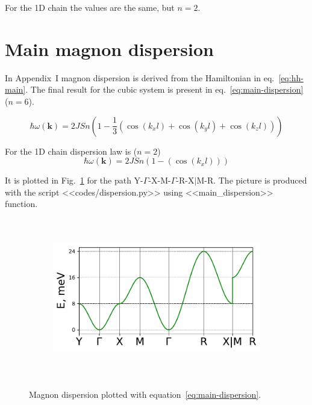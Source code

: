 \documentclass[a4paper,12pt]{article}
\begin{document}
        For the 1D chain the values are the same, but $n = 2$.

    \section{Main magnon dispersion}

        In Appendix~I magnon dispersion is derived from the Hamiltonian in eq.~\eqref{eq:hh-main}.
        The final result for the cubic system is present in eq.~\ref{eq:main-dispersion} ($n = 6$). 

        \begin{equation}
            \hbar\omega(\mathbf{k}) = 2JSn\left(1 - 
            \dfrac{1}{3}\left(\cos(k_x l) + \cos(k_y l) + \cos(k_z l)\right)\right)
            \label{eq:main-dispersion}
        \end{equation}

        For the 1D chain dispersion law is ($n = 2$)
        \begin{equation}
            \hbar\omega(\mathbf{k}) = 2JSn\left(1 - \left(\cos(k_x l)\right)\right)
            \label{eq:main-dispersion-1D}
        \end{equation}

        It is plotted in Fig.~\ref{fig:main-dispersion} for the path Y-$\Gamma$-X-M-$\Gamma$-R-X$\vert$M-R. 
        The picture is produced with the script <<codes/dispersion.py>> using 
        <<main\_dispersion>> function.


        \begin{figure}[H]
            \centering
            \begin{subfigure}[b]{0.8\textwidth}
                \centering
                \includegraphics[height=7cm]{main_dispersion.pdf}
            \end{subfigure}
            \hfill
            \caption{Magnon dispersion plotted with equation~\eqref{eq:main-dispersion}.}
            \label{fig:main-dispersion}
        \end{figure}
\end{document}
